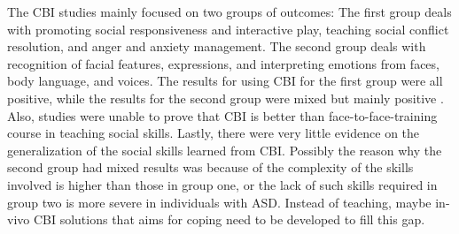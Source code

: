 The CBI studies mainly focused on two groups of outcomes: The first group deals with promoting social responsiveness and interactive play, teaching social conflict resolution, and anger and anxiety management.  The second group deals with recognition of facial features, expressions, and interpreting emotions from faces, body language, and voices.  The results for using CBI for the first group were all positive, while the results for the second group were mixed but mainly positive \cite{ramdoss2012computer}.  Also, studies were unable to prove that CBI is better than face-to-face-training course in teaching social skills.  Lastly, there were very little evidence on the generalization of the social skills learned from CBI.  Possibly the reason why the second group had mixed results was because of the complexity of the skills involved is higher than those in group one, or the lack of such skills required in group two is more severe in individuals with ASD.  Instead of teaching, maybe in-vivo CBI solutions that aims for coping need to be developed to fill this gap.

